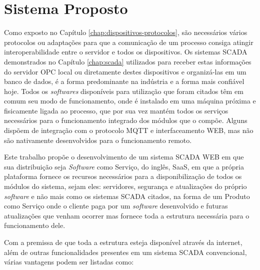 \chapter{Sistema Proposto}
\label{chap:sistema-proposto}

Como exposto no Capítulo \ref{chap:dispositivos-protocolos}, são necessários vários protocolos ou adaptações para que a comunicação de um processo consiga atingir interoperabilidade entre o servidor e todos os dispositivos. Os sistemas \gls{SCADA} demonstrados no Capítulo \ref{chap:scada} utilizados para receber estas informações do servidor \gls{OPC} local ou diretamente destes dispositivos e organizá-las em um banco de dados, é a forma predominante na indústria e a forma mais confiável hoje. Todos os \textit{softwares} disponíveis para utilização que foram citados têm em comum seu modo de funcionamento, onde é instalado em uma máquina próxima e fisicamente ligada ao processo, que por sua vez mantém todos os serviços necessários para o funcionamento integrado dos módulos que o compõe. Alguns dispõem de integração com o protocolo \gls{MQTT} e interfaceamento \gls{WEB}, mas não são nativamente desenvolvidos para o funcionamento remoto.

Este trabalho propõe o desenvolvimento de um sistema \gls{SCADA} \gls{WEB} em que sua distribuição seja \textit{Software} como Serviço, do inglês, \gls{SaaS}, em que a própria plataforma fornece os recursos necessários para a disponibilização de todos os módulos do sistema, sejam eles: servidores, segurança e atualizações do próprio \textit{software} e não mais como os sistemas \gls{SCADA} citados, na forma de um Produto como Serviço onde o cliente paga por um \textit{software} desenvolvido e futuras atualizações que venham ocorrer mas fornece toda a estrutura necessária para o funcionamento dele.

Com a premissa de que toda a estrutura esteja disponível através da internet, além de outras funcionalidades presentes em um sistema \gls{SCADA} convencional, várias vantagens podem ser listadas como:

